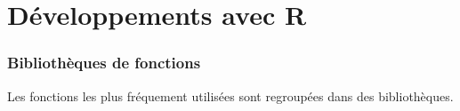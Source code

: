 \part{D\'eveloppements avec R}
\label{part:dev_R}

\section{Bibliothèques de fonctions}
  Les fonctions les plus fréquement utilisées sont regroupées dans des
bibliothèques. 
~

